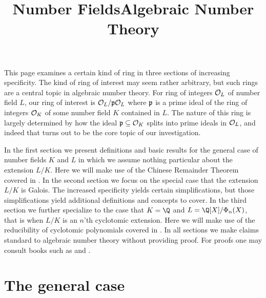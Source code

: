 
\begin{define}
    \newcommand\O{\mathcal{O}}
    \def\i#1{\mathfrak{#1}}
    \def\bar#1{\overline{#1}}
\end{define}

This page examines a certain kind of ring in three sections of increasing specificity.
The kind of ring of interest may seem rather arbitrary, but such rings are a central topic in algebraic number theory.
For ring of integers $\O_L$ of number field $L$, our ring of interest is $\O_L/\i{p}\O_L$ where $\i{p}$ is a prime ideal of the ring of integers $\O_K$ of some number field $K$ contained in $L$.
The nature of this ring is largely determined by how the ideal $\i{p}\subseteq\O_K$ splits into prime ideals in $\O_L$, and indeed that turns out to be the core topic of our investigation.

In the first section we present definitions and basic results for the general case of number fields $K$ and $L$ in which we assume nothing particular about the extension $L/K$.
Here we will make use of the Chinese Remainder Theorem covered in .
In the second section we focus on the special case that the extension $L/K$ is Galois.
The increased specificity yields certain simplifications, but those simplifications yield additional definitions and concepts to cover.
In the third section we further specialize to the case that $K=\Q$ and $L=\Q[X]/\Phi_n(X)$, that is when $L/K$ is an $n$'th cyclotomic extension.
Here we will make use of the reducibility of cyclotomic polynomials covered in .
In all sections we make claims standard to algebraic number theory without providing proof.
For proofs one may consult books such as \cite{Mil20} and \cite{Mar18}.

\begin{references}
    \title{Number Fields}
    \where{}
    \other

    \title{Algebraic Number Theory}
    \other
\end{references}


\section{The general case}

